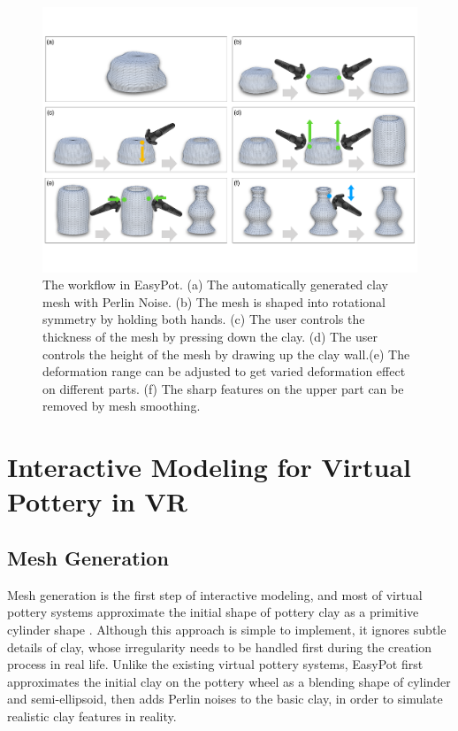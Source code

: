 \documentclass{svjour3}                     %
\begin{document}
\begin{figure}
\includegraphics[width=\textwidth]{fig3}
\caption{The workflow in EasyPot. (a) The automatically generated clay mesh with Perlin Noise. (b) The mesh is shaped into rotational symmetry by holding both hands. (c) The user controls the thickness of the mesh by pressing down the clay. (d) The user controls the height of the mesh by drawing up the clay wall.(e) The deformation range can be adjusted to get varied deformation effect on different parts. (f) The sharp features on the upper part can be removed by mesh smoothing.}
\label{fig:workflow}
\end{figure}

\section{Interactive Modeling for Virtual Pottery in VR}
\label{sec:4}

\subsection{Mesh Generation}
\label{sec:4.1}

Mesh generation is the first step of interactive modeling, and most of virtual pottery systems approximate the initial shape of pottery clay as a primitive cylinder shape \cite{han2007ar,ramani2015gesture,ramani2016extracting}.
Although this approach is simple to implement, it ignores subtle details of clay, whose irregularity needs to be handled first during the creation process in real life.
Unlike the existing virtual pottery systems, EasyPot first approximates the initial clay on the pottery wheel as a blending shape of cylinder and semi-ellipsoid, then adds Perlin noises to the basic clay, in order to simulate realistic clay features in reality.
\end{document}
